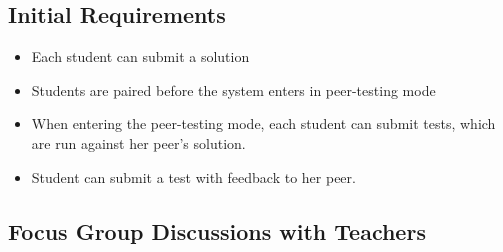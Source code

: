 \documentclass[sigplan,10pt,review]{acmart}\settopmatter{printfolios=true}
\begin{document}
\subsection{Initial Requirements}

\begin{itemize}
\item Each student can submit a solution
\item Students are paired before the system enters in peer-testing mode
\item When entering the peer-testing mode, each student can submit
  tests, which are run against her peer's solution.
\item Student can submit a test with feedback to her peer.
\end{itemize}

\subsection{Focus Group Discussions with Teachers}
\end{document}
